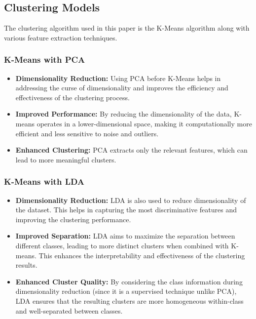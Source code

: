 \documentclass[a4paper]{article}
\theoremstyle{plain}
\theoremstyle{definition}
\begin{document}
{\subsection {Clustering Models}
The clustering algorithm used in this paper is the K-Means algorithm along with various feature extraction techniques.
\subsubsection{K-Means with PCA}
\begin{itemize}
    \item[] \textbf{Dimensionality Reduction:} Using PCA before K-Means helps in addressing the curse of dimensionality and improves the efficiency and effectiveness of the clustering process.
    
    \item[] \textbf{Improved Performance:} By reducing the dimensionality of the data, K-means operates in a lower-dimensional space, making it computationally more efficient and less sensitive to noise and outliers.
    
    \item[] \textbf{Enhanced Clustering:} PCA extracts only the relevant features, which can lead to more meaningful clusters.
\end{itemize}


\subsubsection{K-Means with LDA}
\begin{itemize}
\item[] \textbf{Dimensionality Reduction:} LDA is also used to reduce dimensionality of the dataset. This helps in capturing the most discriminative features and improving the clustering performance.
    
    \item[] \textbf{Improved Separation:} LDA aims to maximize the separation between different classes, leading to more distinct clusters when combined with K-means. This enhances the interpretability and effectiveness of the clustering results.
    
    \item[] \textbf{Enhanced Cluster Quality:} By considering the class information during dimensionality reduction (since it is a supervised technique unlike PCA), LDA ensures that the resulting clusters are more homogeneous within-class and well-separated between classes. 
\end{itemize}
}
\end{document}
